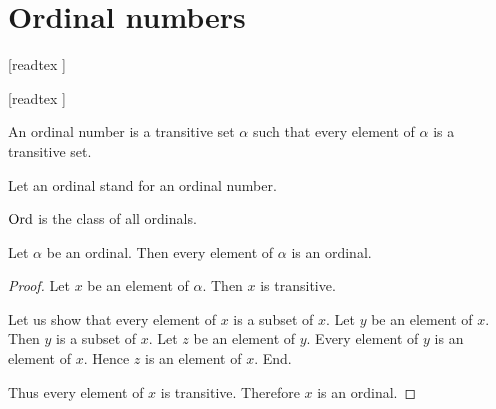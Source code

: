 \documentclass[../set-theory.tex]{subfiles}
\begin{document}
  \chapter{Ordinal numbers}


  \begin{forthel}

    [readtex ]

    [readtex ]

  \end{forthel}


  \begin{forthel}
    \begin{definition}\label{SET_THEORY_15_229593678086144}
      An ordinal number is a transitive set $\alpha$ such that every element of
      $\alpha$ is a transitive set.
    \end{definition}

    Let an ordinal stand for an ordinal number.
  \end{forthel}

  \begin{forthel}
    \begin{definition}\label{SET_THEORY_15_5852994258075648}
      $\mathrm{Ord}$ is the class of all ordinals.
    \end{definition}
  \end{forthel}

  \begin{forthel}
    \begin{proposition}\label{SET_THEORY_15_2358097091756032}
      Let $\alpha$ be an ordinal.
      Then every element of $\alpha$ is an ordinal.
    \end{proposition}
    \begin{proof}
      Let $x$ be an element of $\alpha$.
      Then $x$ is transitive.

      Let us show that every element of $x$ is a subset of $x$.
        Let $y$ be an element of $x$.
        Then $y$ is a subset of $x$.
        Let $z$ be an element of $y$.
        Every element of $y$ is an element of $x$.
        Hence $z$ is an element of $x$.
      End.

      Thus every element of $x$ is transitive.
      Therefore $x$ is an ordinal.
    \end{proof}
  \end{forthel}
\end{document}
